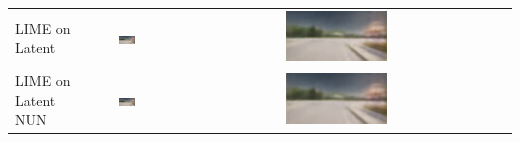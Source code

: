 \begin{table}[htbp]
\begin{tabular}{>{\centering\arraybackslash}p{3.5cm} >{\centering\arraybackslash}c >{\centering\arraybackslash}c}
        \addlinespace
        LIME on Latent & 
        \includegraphics[width=0.3\textwidth]{img/masking_results/original.png} & 
        \includegraphics[width=0.3\textwidth]{img/masking_results/lime_latent_cf.png} \\
        \addlinespace
        LIME on Latent NUN & 
        \includegraphics[width=0.3\textwidth]{img/masking_results/original.png} & 
        \includegraphics[width=0.3\textwidth]{img/masking_results/lime_NUN_cf.png} \\
        \bottomrule
    \end{tabular}
\end{table}

